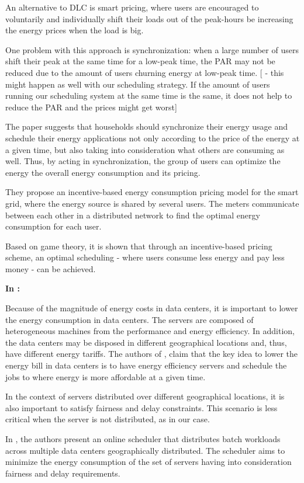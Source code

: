 An alternative to DLC is smart pricing, where users are encouraged to
voluntarily and individually shift their loads out of the peak-hours be
increasing the energy prices when the load is big.

One problem with this approach is synchronization: when a large number of users
shift their peak at the same time for a low-peak time, the PAR may not be
reduced due to the amount of users churning energy at low-peak time.
[ - this might happen as well with our scheduling strategy. If the amount of
users running our scheduling system at the same time is the same, it does not
help to reduce the PAR and the prices might get worst]

The paper suggests that households should synchronize their energy usage and
schedule their energy applications not only according to the price of the energy
at a given time, but also taking into consideration what others are consuming as
well. Thus, by acting in synchronization, the group of users can optimize the
energy the overall energy consumption and its pricing. 

They propose an incentive-based energy consumption pricing model for the smart
grid, where the energy source is shared by several users. The meters communicate
between each other in a distributed network to find the optimal energy
consumption for each user.

Based on game theory, it is shown that through an incentive-based pricing
scheme, an optimal scheduling - where users consume less energy and pay less
money - can be achieved.

\textbf{In \cite{EFF_JOB_SCHEDULING}:}

Because of the magnitude of energy costs in data centers, it is important to
lower the energy consumption in data centers. The servers are composed of
heterogeneous machines from the performance and energy efficiency. In addition,
the data centers may be disposed in different geographical locations and, thus,
have different energy tariffs. The authors of \cite{EFF_JOB_SCHEDULING}, claim that
the key idea to lower the energy bill in data centers is to have energy
efficiency servers and schedule the jobs to where energy is more affordable at a
given time.

In the context of servers distributed over different geographical locations, it
is also important to satisfy fairness and delay constraints. This scenario is
less critical when the server is not distributed, as in our case.

In \cite{EFF_JOB_SCHEDULING}, the authors present an online scheduler that
distributes batch workloads across multiple data centers geographically
distributed. The scheduler aims to minimize the energy consumption of the set of
servers having into consideration fairness and delay requirements.   

